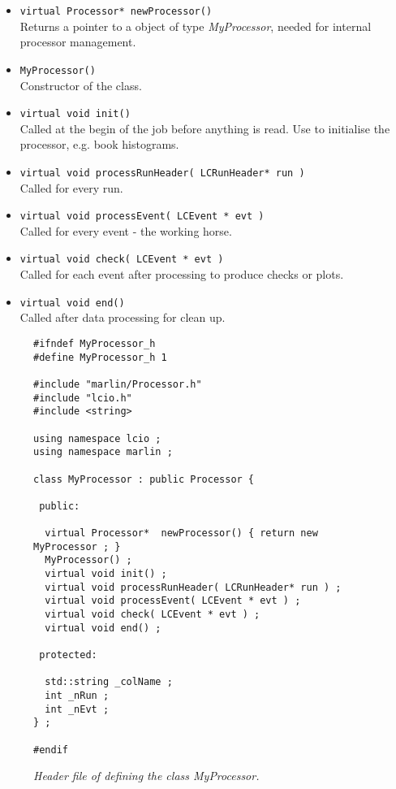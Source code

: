\begin{itemize}
\item {\tt virtual Processor*  newProcessor()} \\
      Returns a pointer to a object of type {\em MyProcessor},
      needed for internal processor management.
\item {\tt MyProcessor()} \\
      Constructor of the class.
\item {\tt virtual void init()} \\
      Called at the begin of the job before anything is read.
      Use to initialise the processor, e.g. book histograms.
\item {\tt virtual void processRunHeader( LCRunHeader* run )} \\
      Called for every run.
\item {\tt virtual void processEvent( LCEvent * evt )} \\
      Called for every event - the working horse.
\item {\tt virtual void check( LCEvent * evt )} \\
      Called for each event after processing to produce checks or plots.
\item {\tt virtual void end()} \\
      Called after data processing for clean up.
\end{itemize}

\begin{figure}
\begin{verbatim}
#ifndef MyProcessor_h
#define MyProcessor_h 1

#include "marlin/Processor.h"
#include "lcio.h"
#include <string>

using namespace lcio ;
using namespace marlin ;

class MyProcessor : public Processor {

 public:

  virtual Processor*  newProcessor() { return new MyProcessor ; }
  MyProcessor() ;
  virtual void init() ;
  virtual void processRunHeader( LCRunHeader* run ) ;
  virtual void processEvent( LCEvent * evt ) ;
  virtual void check( LCEvent * evt ) ;
  virtual void end() ;

 protected:

  std::string _colName ;
  int _nRun ;
  int _nEvt ;
} ;

#endif
\end{verbatim}
\caption{\label{fig:myprocessor_h}
\em Header file of defining the class {\em MyProcessor}.
}
\end{figure}

